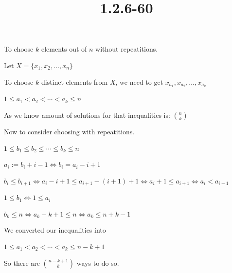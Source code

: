 \documentclass{article}
\title{1.2.6-60}
\begin{document}
\maketitle

To choose $k$ elements out of $n$ without repeatitions.

Let $X = \{ x_1, x_2, \ldots, x_n \}$

To choose $k$ distinct elements from $X$, we need to get $x_{a_1}, x_{a_2}, \ldots, x_{a_k}$

$1 \leq a_1 < a_2 < \cdots < a_k \leq n$

As we know amount of solutions for that inequalities is: $\binom{n}{k}$

Now to consider choosing with repeatitions.

$1 \leq b_1 \leq b_2 \leq \cdots \leq b_k \leq n$

$a_i := b_i + i - 1 \iff b_i = a_i - i + 1$

$b_i \leq b_{i+1} \iff a_i - i + 1 \leq a_{i+1} - (i+1) + 1 \iff a_{i} + 1 \leq a_{i+1} \iff a_i < a_{i+1}$

$1 \leq b_1 \iff 1 \leq a_i$

$b_k \leq n \iff a_k - k + 1 \leq n \iff a_k \leq n + k - 1$

We converted our inequalities into

$1 \leq a_1 < a_2 < \cdots < a_k \leq n - k + 1$

So there are $\binom{n-k+1}{k}$ ways to do so.
\end{document}
